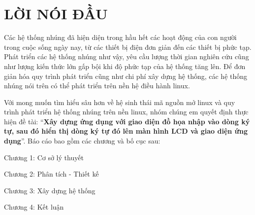 \documentclass{report}
\begin{document}



\renewcommand{\contentsname}{MỤC LỤC}
\renewcommand{\listfigurename}{DANH SÁCH HÌNH VẼ}
\renewcommand{\listtablename}{DANH SÁCH BẢNG}

\cleardoublepage
{}
{}


\tableofcontents

\cleardoublepage
{}
{}

\listoffigures

\cleardoublepage
{}
{}

\listoftables

\printnoidxglossary[title=DANH MỤC TỪ VIẾT TẮT, toctitle=DANH SÁCH TỪ VIẾT TẮT, type=\acronymtype]

\chapter*{LỜI NÓI ĐẦU}
{}


Các hệ thống nhúng đã hiện diện trong hầu hết các hoạt động của con người trong cuộc sống ngày nay, từ các thiết bị điện đơn giản đến các thiết bị phức tạp. Phát triển các hệ thống nhúng như vậy, yêu cầu lượng thời gian nghiên cứu cũng như lượng kiến thức lớn gấp bội khi độ phức tạp của hệ thống tăng lên. Để đơn giản hóa quy trình phát triển cũng như chi phí xây dựng hệ thống, các hệ thống nhúng nói trên có thể phát triển trên nền hệ điều hành linux.


Với mong muốn tìm hiểu sâu hơn về hệ sinh thái mã nguồn mở linux và quy trình phát triển hệ thống nhúng trên nền linux, nhóm chúng em quyết định thực hiện đề tài: “\textbf{Xây dựng ứng dụng với giao diện đồ họa nhập vào dòng ký tự, sau đó hiển thị dòng ký tự đó lên màn hình LCD và giao diện ứng dụng}”. Báo cáo bao gồm các chương và bố cục sau:

\hspace{1cm}Chương 1: Cơ sở lý thuyết

\hspace{1cm}Chương 2: Phân tích - Thiết kế

\hspace{1cm}Chương 3: Xây dựng hệ thống

\hspace{1cm}Chương 4: Kết luận
\end{document}
